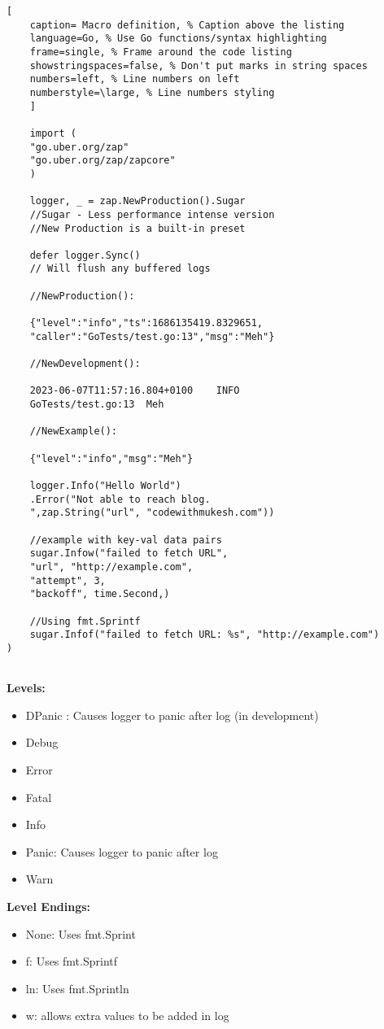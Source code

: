 \documentclass[11pt]{scrartcl} %
\begin{document}
\begin{lstlisting}[
	caption= Macro definition, % Caption above the listing
	language=Go, % Use Go functions/syntax highlighting
	frame=single, % Frame around the code listing
	showstringspaces=false, % Don't put marks in string spaces
	numbers=left, % Line numbers on left
	numberstyle=\large, % Line numbers styling
	]

	import (
	"go.uber.org/zap"
	"go.uber.org/zap/zapcore"
	)
	
	logger, _ = zap.NewProduction().Sugar 
	//Sugar - Less performance intense version
	//New Production is a built-in preset

	defer logger.Sync() 
	// Will flush any buffered logs

	//NewProduction():

	{"level":"info","ts":1686135419.8329651,
	"caller":"GoTests/test.go:13","msg":"Meh"}

	//NewDevelopment():

	2023-06-07T11:57:16.804+0100	INFO	
	GoTests/test.go:13	Meh

	//NewExample():

	{"level":"info","msg":"Meh"}

	logger.Info("Hello World")
	.Error("Not able to reach blog.
	",zap.String("url", "codewithmukesh.com"))

	//example with key-val data pairs 
	sugar.Infow("failed to fetch URL",
  	"url", "http://example.com",
  	"attempt", 3,
  	"backoff", time.Second,)

	//Using fmt.Sprintf
	sugar.Infof("failed to fetch URL: %s", "http://example.com")
)


\end{lstlisting}

\textbf{Levels:}
\begin{itemize}
	\item DPanic : Causes logger to panic after log (in development)
	\item Debug
	\item Error
	\item Fatal
	\item Info
	\item Panic: Causes logger to panic after log
	\item Warn
\end{itemize}

\textbf{Level Endings:}
\begin{itemize}
	\item None: Uses fmt.Sprint
	\item f: Uses fmt.Sprintf
	\item ln: Uses fmt.Sprintln
	\item w: allows extra values to be added in log
\end{itemize}
\end{document}
